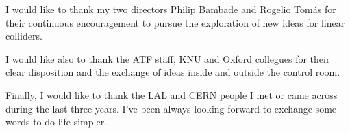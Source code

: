 \vfill
I would like to thank my two directors Philip Bambade and Rogelio Tom\'as for their continuous encouragement to pursue the exploration of new ideas for linear colliders.\par
I would like also to thank the ATF staff, KNU and Oxford collegues for their clear disposition and the exchange of ideas inside and outside the control room.\par
Finally, I would like to thank the LAL and CERN people I met or came across during the last three years. I've been always looking forward to exchange some words to do life simpler.\par

